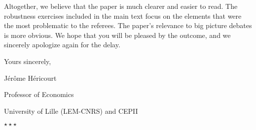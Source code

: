 \documentclass[12pt]{article}
\newcommand*\sepstars{%
  \begin{center}
    $\star\star\star$
  \end{center}}
\begin{document}
Altogether, we believe that the paper is much clearer and easier to read. The robustness exercises included in the main text focus on the elements that were the most problematic to the referees. The paper's relevance to big picture debates is more obvious. We hope that you will be pleased by the outcome, and we sincerely apologize again for the delay.

\bigskip

Yours sincerely,

\bigskip

\hfill Jérôme Héricourt

\hfill Professor of Economics

\hfill University of Lille (LEM-CNRS) and CEPII

\bigskip
\bigskip
\bigskip
\sepstars
\end{document}
